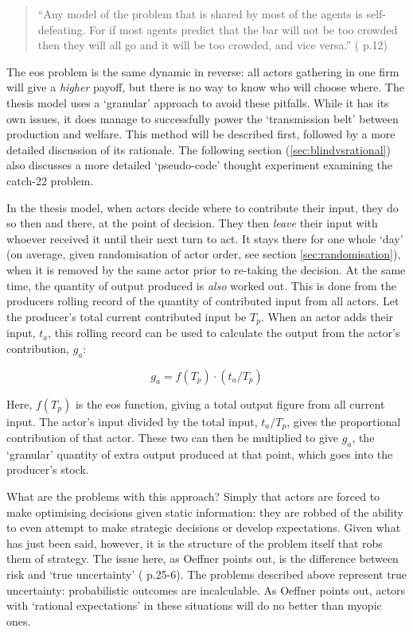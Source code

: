 {\begin{quote}
``Any model of the problem that is shared by most of the agents is self-defeating. For if most agents predict that the bar will not be too crowded then they will all go and it will be too crowded, and vice versa.'' (\citealt{brenner_modelling_1999} p.12)
\end{quote}

The \gls{eos} problem is the same dynamic in reverse: all actors gathering in one firm will give a \emph{higher} payoff, but there is no way to know who will choose where. The thesis model uses a `granular' approach to avoid these pitfalls. While it has its own issues, it does manage to successfully power the `transmission belt' between production and welfare. This method will be described first, followed by a more detailed discussion of its rationale. The following section (\ref{sec:blindvsrational}) also discusses a more detailed `pseudo-code' thought experiment examining the catch-22 problem.

In the thesis model, when actors decide where to contribute their input, they do so then and there, at the point of decision. They then \emph{leave} their input with whoever received it until their next turn to act. It stays there for one whole `day' (on average, given randomisation of actor order, see section \ref{sec:randomisation}), when it is removed by the same actor prior to re-taking the decision. At the same time, the quantity of output produced is \emph{also} worked out. This is done from the producers rolling record of the quantity of contributed input from all actors. Let the producer's total current contributed input be $T_p$. When an actor adds their input, $t_a$, this rolling record can be used to calculate the output from the actor's contribution, $g_a$:

\begin{equation}
g_a = f(T_p) \cdot (t_a / T_p)
\end{equation}

Here, $f(T_p)$ is the \gls{eos} function, giving a total output figure from all current input. The actor's input divided by the total input, $t_a/T_p$, gives the proportional contribution of that actor. These two can then be multiplied to give $g_a$, the `granular' quantity of extra output produced at that point, which goes into the producer's stock.

What are the problems with this approach? Simply that actors are forced to make optimising decisions given static information: they are robbed of the ability to even attempt to make strategic decisions or develop expectations. Given what has just been said, however, it is the structure of the problem itself that robs them of strategy. The issue here, as Oeffner points out, is the difference between risk and `true uncertainty' (\citealt{oeffner_agent-based_2008} p.25-6). The problems described above represent true uncertainty: probabilistic outcomes are incalculable. As Oeffner points out, actors with `rational expectations' in these situations will do no better than myopic ones. 

}
